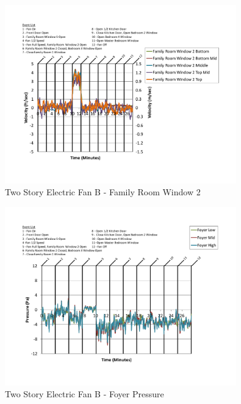 \documentclass{article}
\begin{document}
\begin{appendices}
	\begin{figure}[H]
		\centering
		\includegraphics[height=3.05in,trim=0.67in 1.1in 0.67in 0.8in,clip=true]{0_Images/Results_Charts/ColdFlow/Two_Story/Electric/B/Family_Room_Window_2.pdf}
		\caption{Two Story Electric Fan B - Family Room Window 2}
	\end{figure}
 

	\begin{figure}[H]
		\centering
		\includegraphics[height=3.05in,trim=0.67in 1.1in 0.67in 0.8in,clip=true]{0_Images/Results_Charts/ColdFlow/Two_Story/Electric/B/Foyer_Pressure.pdf}
		\caption{Two Story Electric Fan B - Foyer Pressure}
	\end{figure}
 
	\clearpage


\end{appendices}
\end{document}
